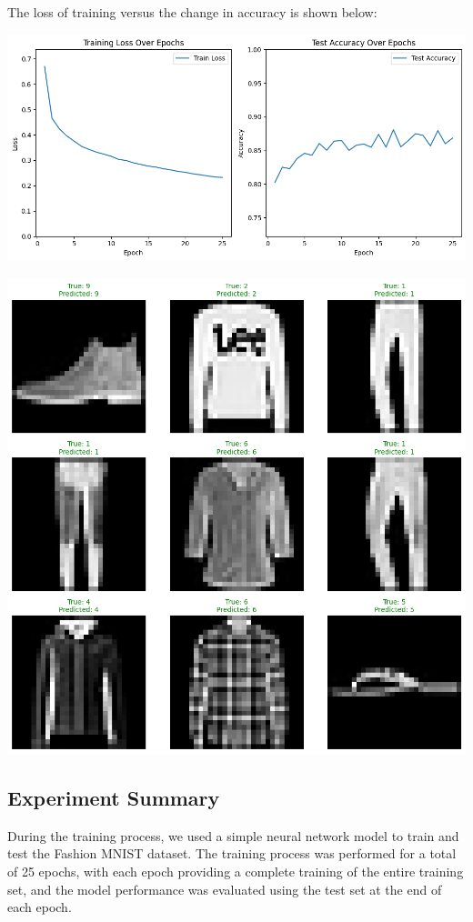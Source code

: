 \documentclass[a4paper,12pt]{article}
\begin{document}
The loss of training versus the change in accuracy is shown below:

\centering %
\includegraphics[width=0.8\linewidth]{images/lab1_3_loss.png}


\includegraphics[width=0.8\linewidth]{images/lab1_3_result.png}

\justifying

\subsection{Experiment Summary}
During the training process, we used a simple neural network model to train and test the Fashion MNIST dataset. The training process was performed for a total of 25 epochs, with each epoch providing a complete training of the entire training set, and the model performance was evaluated using the test set at the end of each epoch.
\end{document}
